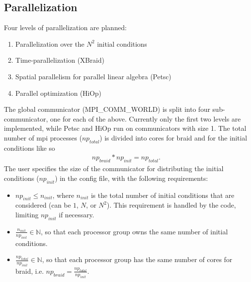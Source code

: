 \documentclass[letterpaper]{article}
\begin{document}
  \subsection{Parallelization}
    Four levels of parallelization are planned: 
      \begin{enumerate}
        \item Parallelization over the $N^2$ initial conditions
        \item Time-parallelization (XBraid)
        \item Spatial parallelism for parallel linear algebra (Petsc)
        \item Parallel optimization (HiOp)
      \end{enumerate}
      The global communicator (MPI\_COMM\_WORLD) is split into four sub-communicator, one for each of the above. Currently only the first two levels are implemented, while Petsc and HiOp run on communicators with size 1. The total number of mpi processes ($np_{total}$) is divided into cores for braid and for the initial conditions like so
         \begin{align*}
           np_{braid} * np_{init} = np_{total}.
         \end{align*}
      The user specifies the size of the communicator for distributing the initial conditions ($np_{init}$) in the config file, with the following requirements:
      \begin{itemize}
        \item $np_{init} \leq n_{init}$, where $n_{init}$ is the total number of initial conditions that are considered (can be $1$, $N$, or $N^2$). This requirement is handled by the code, limiting $np_{init}$ if necessary.
        \item $\frac{n_{init}}{np_{init}} \in \mathds{N}$, so that each processor group owns the same number of initial conditions.
        \item $\frac{np_{total}}{np_{init}} \in \mathds{N}$, so that each processor group has the same number of cores for braid, i.e. $np_{braid} = \frac{np_{total}}{np_{init}}$.
      \end{itemize}
  
\end{document}
